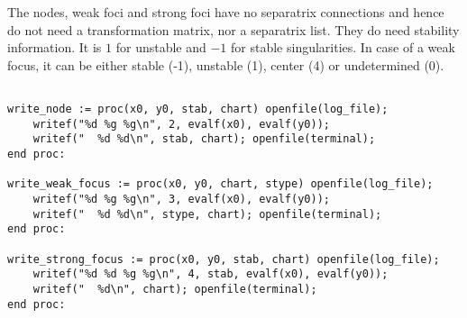 \documentclass[a4paper,10pt]{article}
\begin{document}
The nodes, weak foci and strong foci have no separatrix connections and hence do not need a transformation matrix, nor a separatrix list.  They do need stability information.
It is $1$ for unstable and $-1$ for stable singularities.  In case of a weak focus, it can be either stable (-1), unstable (1), center  (4) or undetermined (0).

\begin{lstlisting}[name=writelog]

write_node := proc(x0, y0, stab, chart) openfile(log_file);
    writef("%d %g %g\n", 2, evalf(x0), evalf(y0));
    writef("  %d %d\n", stab, chart); openfile(terminal);
end proc:

write_weak_focus := proc(x0, y0, chart, stype) openfile(log_file);
    writef("%d %g %g\n", 3, evalf(x0), evalf(y0));
    writef("  %d %d\n", stype, chart); openfile(terminal);
end proc:

write_strong_focus := proc(x0, y0, stab, chart) openfile(log_file);
    writef("%d %d %g %g\n", 4, stab, evalf(x0), evalf(y0));
    writef("  %d\n", chart); openfile(terminal);
end proc:

\end{lstlisting}
\end{document}
